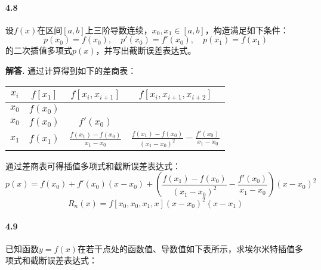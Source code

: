 \documentclass[12pt, a4paper, oneside]{ctexart}
\newenvironment{solution}{\par\noindent\textbf{解答. }}{\bigskip\par}
\begin{document}
\paragraph{4.8}设$f(x)$在区间$[a,b]$上三阶导数连续，$x_0,x_1\in[a,b]$，构造满足如下条件：
\begin{equation*}
    p(x_0)=f(x_0),\quad p'(x_0)=f'(x_0),\quad p(x_1)=f(x_1)
\end{equation*}
的二次插值多项式$p(x)$，并写出截断误差表达式。
\begin{solution}
    通过计算得到如下的差商表：
    \renewcommand\arraystretch{0.8}
    \begin{table}[!htbp]
        \centering
        \begin{tabular}{cccc}
            \toprule
            $x_i$ & $f[x_1]$ & $f[x_i,x_{i+1}]$ & $f[x_i,x_{i+1},x_{i+2}]$ \\
            \midrule
            $x_0$ & $f(x_0)$ &                  &                          \\
            $x_0$ & $f(x_0)$ & $f'(x_0)$        &                          \\
            $x_1$ & $f(x_1)$ & $\frac{f(x_1)-f(x_0)}{x_1-x_0}$ & $\frac{f(x_1)-f(x_0)}{(x_1-x_0)^2}-\frac{f'(x_0)}{x_1-x_0}$\\
            \bottomrule
        \end{tabular}
    \end{table}

    通过差商表可得插值多项式和截断误差表达式：
    \begin{equation*}
        p(x) = f(x_0)+f'(x_0)(x-x_0)+\left(\frac{f(x_1)-f(x_0)}{(x_1-x_0)^2}-\frac{f'(x_0)}{x_1-x_0}\right)(x-x_0)^2
    \end{equation*}
    \begin{equation*}
        R_n(x)=f[x_0,x_0,x_1,x](x-x_0)^2(x-x_1)
    \end{equation*}
\end{solution}
\paragraph{4.9}已知函数$y=f(x)$在若干点处的函数值、导数值如下表所示，求埃尔米特插值多项式和截断误差表达式：
\end{document}
